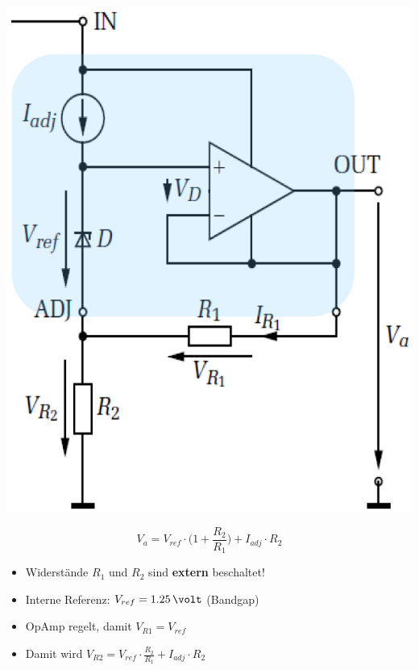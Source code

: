 \begin{minipage}[c]{0.22\columnwidth}
    \includegraphics[width=\columnwidth]{images/einstellbarer_seriespannungsregler.png}
\end{minipage}
\hfill
\begin{minipage}[c]{0.76\columnwidth}
    $$ \boxed{ V_a = V_{ref} \cdot \Big( 1 + \frac{R_2}{R_1} \Big) + I_{adj} \cdot R_2 }$$
    \begin{itemize}
        \item Widerstände $R_1$ und $R_2$ sind \textbf{extern} beschaltet!
        \item Interne Referenz: $V_{ref} = 1.25 \, \volt$ (Bandgap)
        \item OpAmp regelt, damit $V_{R1} = V_{ref}$
        \item Damit wird $V_{R2} = V_{ref} \cdot \frac{R_2}{R_1} + I_{adj} \cdot R_2$
    \end{itemize}
\end{minipage}
